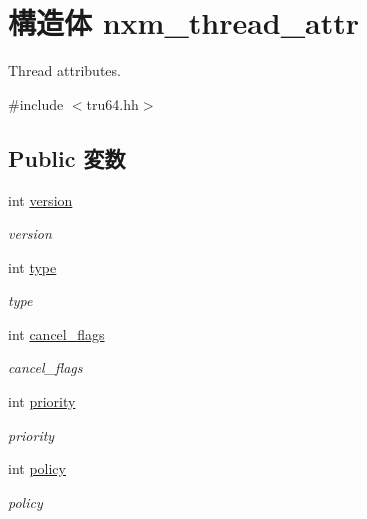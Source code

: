 \hypertarget{structTru64_1_1nxm__thread__attr}{
\section{構造体 nxm\_\-thread\_\-attr}
\label{structTru64_1_1nxm__thread__attr}
}


Thread attributes.  


{\ttfamily \#include $<$tru64.hh$>$}\subsection*{Public 変数}
\begin{DoxyCompactItemize}
\item 
int \hyperlink{structTru64_1_1nxm__thread__attr_aad880fc4455c253781e8968f2239d56f}{version}
\begin{DoxyCompactList}\small\item\em version \item\end{DoxyCompactList}\item 
int \hyperlink{structTru64_1_1nxm__thread__attr_ac765329451135abec74c45e1897abf26}{type}
\begin{DoxyCompactList}\small\item\em type \item\end{DoxyCompactList}\item 
int \hyperlink{structTru64_1_1nxm__thread__attr_abae33d4052ae649b5a0c3a3e708ab255}{cancel\_\-flags}
\begin{DoxyCompactList}\small\item\em cancel\_\-flags \item\end{DoxyCompactList}\item 
int \hyperlink{structTru64_1_1nxm__thread__attr_acec9ce2df15222151ad66fcb1d74eb9f}{priority}
\begin{DoxyCompactList}\small\item\em priority \item\end{DoxyCompactList}\item 
int \hyperlink{structTru64_1_1nxm__thread__attr_af1360db1ee84d9d6f13b0b9a3114b6b7}{policy}
\begin{DoxyCompactList}\small\item\em policy \item\end{DoxyCompactList}\item 

\end{DoxyCompactItemize}
